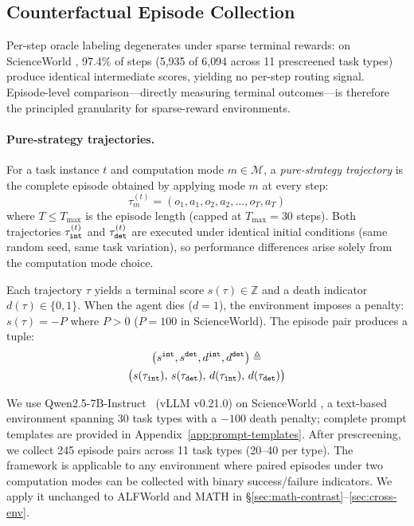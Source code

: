 \subsection{Counterfactual Episode Collection}
\label{sec:collection}

Per-step oracle labeling degenerates under sparse terminal rewards: on ScienceWorld \citep{scienceworld-2022}, 97.4\% of steps (5{,}935 of 6{,}094 across 11 prescreened task types) produce identical intermediate scores, yielding no per-step routing signal. Episode-level comparison---directly measuring terminal outcomes---is therefore the principled granularity for sparse-reward environments.

\paragraph{Pure-strategy trajectories.}
For a task instance $t$ and computation mode $m \in \mathcal{M}$, a \emph{pure-strategy trajectory} is the complete episode obtained by applying mode $m$ at every step:
\begin{equation}
    \tau_m^{(t)} = (o_1, a_1, o_2, a_2, \ldots, o_T, a_T)
\end{equation}
where $T \leq T_{\max}$ is the episode length (capped at $T_{\max} = 30$ steps). Both trajectories $\tau_{\tt int}^{(t)}$ and $\tau_{\tt det}^{(t)}$ are executed under identical initial conditions (same random seed, same task variation), so performance differences arise solely from the computation mode choice.

Each trajectory $\tau$ yields a terminal score $s(\tau) \in \mathbb{Z}$ and a death indicator $d(\tau) \in \{0, 1\}$. When the agent dies ($d = 1$), the environment imposes a penalty: $s(\tau) = -P$ where $P > 0$ ($P = 100$ in ScienceWorld). The episode pair produces a tuple:
\begin{multline}
    \bigl(s^{\tt int}, s^{\tt det}, d^{\tt int}, d^{\tt det}\bigr) \triangleq \\
    \bigl(s(\tau_{\tt int}),\, s(\tau_{\tt det}),\, d(\tau_{\tt int}),\, d(\tau_{\tt det})\bigr)
\end{multline}

We use Qwen2.5-7B-Instruct~\citep{qwen25-2024} (vLLM v0.21.0) on ScienceWorld \citep{scienceworld-2022}, a text-based environment spanning 30 task types with a $-100$ death penalty; complete prompt templates are provided in Appendix~\ref{app:prompt-templates}. After prescreening, we collect 245 episode pairs across 11 task types (20--40 per type). The framework is applicable to any environment where paired episodes under two computation modes can be collected with binary success/failure indicators. We apply it unchanged to ALFWorld and MATH in \S\ref{sec:math-contrast}--\ref{sec:cross-env}.

